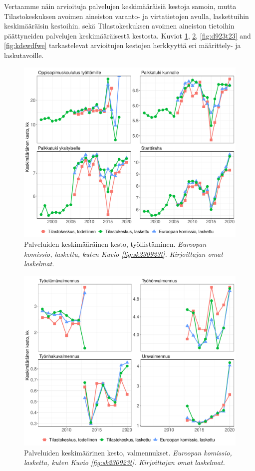 \documentclass[12pt]{article}
\newcommand{\captionselite}[1] {\textit{\footnotesize{#1}}}
\newcommand{\seliteduration}[1] {}
\begin{document}
Vertaamme näin arvioituja palvelujen keskimääräisiä kestoja samoin, mutta Tilastokeskuksen avoimen aineiston varanto- ja virtatietojen avulla, laskettuihin keskimääräisin kestoihin. sekä Tilastokeskuksen avoimen aineiston tietoihin päättyneiden palvelujen keskimääräisestä kestosta.  Kuviot \ref{fig:0bn233t}, \ref{fig:9sedt23}, \ref{fig:d923t23} and \ref{fig:kdswdfwe} tarkastelevat arvioitujen kestojen herkkyyttä eri määrittely- ja laskutavoille. 

\begin{figure}
\centering
\includegraphics[scale = 0.6]{../plots/durations/tyollistaminen.pdf}
\caption{Palveluiden keskimääräinen kesto, työllistäminen. \captionselite{\protect \seliteduration{tyollistaminen} Euroopan komissio, laskettu, kuten Kuvio \ref{fig:sk230923t}. Kirjoittajan omat laskelmat.}}
   \label{fig:0bn233t}
\end{figure}

\begin{figure}
\centering
\includegraphics[scale = 0.6]{../plots/durations/valmennus.pdf}
\caption{Palveluiden keskimäärinen kesto, valmennukset. \captionselite{\protect \seliteduration{valmennus} Euroopan komissio, laskettu, kuten Kuvio \ref{fig:sk230923t}. Kirjoittajan omat laskelmat.}}
   \label{fig:9sedt23}
\end{figure}
\end{document}
